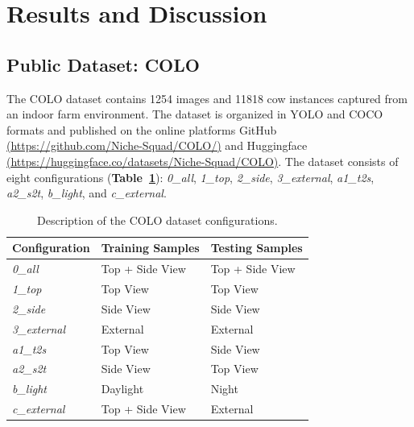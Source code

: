 \section{Results and Discussion}
\label{sec:results_discussion}

\subsection{Public Dataset: COLO}

The COLO dataset contains 1254 images and 11818 cow instances captured from an indoor farm environment. The dataset is organized in YOLO and COCO formats and published on the online platforms GitHub \href{https://github.com/Niche-Squad/COLO/}{(https://github.com/Niche-Squad/COLO/)} and Huggingface \href{https://huggingface.co/datasets/Niche-Squad/COLO}{(https://huggingface.co/datasets/Niche-Squad/COLO)}. The dataset consists of eight configurations (\textbf{Table~\ref{tab:colo_config}}): \textit{0\_all}, \textit{1\_top}, \textit{2\_side}, \textit{3\_external}, \textit{a1\_t2s}, \textit{a2\_s2t}, \textit{b\_light}, and \textit{c\_external}. 

\begin{table}[H]
    \caption{Description of the COLO dataset configurations.}
    \centering
    \begin{tabular}{|l|l|l|}
        \hline
        \textbf{Configuration} & \textbf{Training Samples} & \textbf{Testing Samples} \\
        \hline
        \textit{0\_all} & Top + Side View & Top + Side View \\
        \textit{1\_top} & Top View & Top View \\
        \textit{2\_side} & Side View & Side View \\
        \textit{3\_external} & External & External \\
        \midrule
        \textit{a1\_t2s} & Top View & Side View \\
        \textit{a2\_s2t} & Side View & Top View \\
        \textit{b\_light} & Daylight & Night \\
        \textit{c\_external} & Top + Side View & External \\
        \hline
    \end{tabular}
    \label{tab:colo_config}
\end{table}

